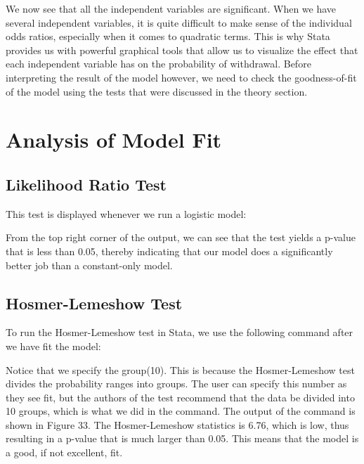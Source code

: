 \documentclass[a4paper,12pt,oneside]{book}
\begin{document}
\begin{stlog}\end{stlog}

We now see that all the independent variables are significant. When we have several independent variables, it is quite difficult to make sense of the individual odds ratios, especially 
when it comes to quadratic terms. This is why Stata provides us with powerful graphical tools that allow us to visualize the effect that each independent variable has on the probability of withdrawal. 
Before interpreting the result of the model however, we need to check the goodness-of-fit of the model using the tests that were discussed in the theory section.
\section{Analysis of Model Fit}
\subsection{Likelihood Ratio Test}
This test is displayed whenever we run a logistic model:

\begin{stlog}\end{stlog}

From the top right corner of the output, we can see that the test yields a p-value that is less than 0.05, thereby indicating that our model does a significantly better job than a constant-only model. 

\subsection{Hosmer-Lemeshow Test}
To run the Hosmer-Lemeshow test in Stata, we use the following command after we have fit the model:

\begin{stlog}\end{stlog}

Notice that we specify the group(10). This is because the Hosmer-Lemeshow test divides the probability ranges into groups. The user can specify this number as they see fit, but the authors of the test recommend that 
the data be divided into 10 groups, which is what we did in the command. The output of the command is shown in Figure 33. The Hosmer-Lemeshow statistics is 6.76, which is low, thus resulting in a p-value 
that is much larger than 0.05. This means that the model is a good, if not excellent, fit.
\end{document}
